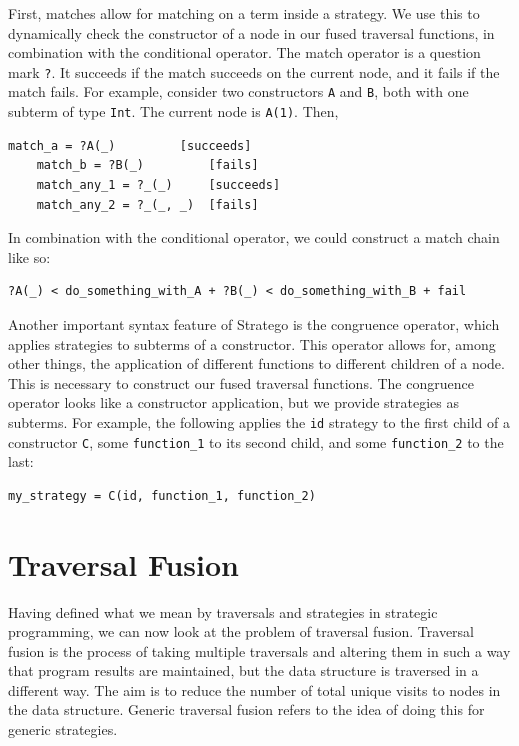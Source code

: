 First, matches allow for matching on a term inside a strategy. We use this to dynamically check the constructor of a node in our fused traversal functions, in combination with the conditional operator. The match operator is a question mark \texttt{?}. It succeeds if the match succeeds on the current node, and it fails if the match fails. For example, consider two constructors \texttt{A} and \texttt{B}, both with one subterm of type \texttt{Int}. The current node is \texttt{A(1)}. Then,

\begin{lstlisting}[style = mystyle_small_stratego_listings]
    match_a = ?A(_)         [succeeds]
    match_b = ?B(_)         [fails]
    match_any_1 = ?_(_)     [succeeds]
    match_any_2 = ?_(_, _)  [fails]
\end{lstlisting}

In combination with the conditional operator, we could construct a match chain like so:

\begin{lstlisting}[style = mystyle_small_stratego_listings]
    ?A(_) < do_something_with_A + ?B(_) < do_something_with_B + fail
\end{lstlisting}

Another important syntax feature of Stratego is the congruence operator, which applies strategies to subterms of a constructor. This operator allows for, among other things, the application of different functions to different children of a node. This is necessary to construct our fused traversal functions. The congruence operator looks like a constructor application, but we provide strategies as subterms. For example, the following applies the \texttt{id} strategy to the first child of a constructor \texttt{C}, some \texttt{function\_1} to its second child, and some \texttt{function\_2} to the last:

\begin{lstlisting}[style = mystyle_small_stratego_listings]
    my_strategy = C(id, function_1, function_2)
\end{lstlisting}

\section{Traversal Fusion}
Having defined what we mean by traversals and strategies in strategic programming, we can now look at the problem of traversal fusion. Traversal fusion is the process of taking multiple traversals and altering them in such a way that program results are maintained, but the data structure is traversed in a different way. The aim is to reduce the number of total unique visits to nodes in the data structure. Generic traversal fusion refers to the idea of doing this for generic strategies.

